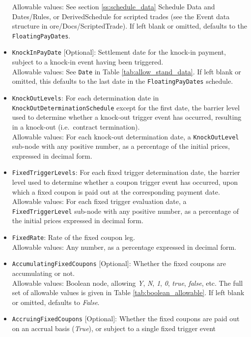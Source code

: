 \begin{itemize}
    Allowable values: See section \ref{ss:schedule_data} Schedule Data and Dates/Rules, or
    DerivedSchedule for scripted trades (see the Event data structure in ore/Docs/ScriptedTrade).
    If left blank or omitted, defaults to the \lstinline!FloatingPayDates!.
  \item \lstinline!KnockInPayDate! [Optional]: Settlement date for the knock-in
  payment, subject to a knock-in event having been triggered. \\
    Allowable values: See \lstinline!Date! in Table \ref{tab:allow_stand_data}. If left blank
    or omitted, this defaults to the last date in the \lstinline!FloatingPayDates! schedule.
  \item \lstinline!KnockOutLevels!: For each determination date in
  \lstinline!KnockOutDeterminationSchedule! except for the first date, the barrier level used
  to determine whether a knock-out trigger event has occurred, resulting in a knock-out (i.e.\
  contract termination). \\
    Allowable values: For each knock-out determination date, a \lstinline!KnockOutLevel!
    sub-node with any positive number, as a percentage of the initial prices, expressed in
    decimal form.
  \item \lstinline!FixedTriggerLevels!: For each fixed trigger determination date, the
  barrier level used to determine whether a coupon trigger event has occurred, upon which a
  fixed coupon is paid out at the corresponding payment date. \\
    Allowable values: For each fixed trigger evaluation date, a \lstinline!FixedTriggerLevel!
    sub-node with any positive number, as a percentage of the initial prices expressed in
    decimal form.
  \item \lstinline!FixedRate!: Rate of the fixed coupon leg. \\
    Allowable values: Any number, as a percentage expressed in decimal form.
  \item \lstinline!AccumulatingFixedCoupons! [Optional]: Whether the fixed coupons are accumulating or not. \\
    Allowable values: Boolean node, allowing \emph{Y}, \emph{N}, \emph{1}, \emph{0},
    \emph{true}, \emph{false}, etc. The full set of allowable values is given in Table
    \ref{tab:boolean_allowable}. If left blank or omitted, defaults to \emph{False}.
  \item \lstinline!AccruingFixedCoupons! [Optional]: Whether the fixed coupons are paid
  out on an accrual basis (\emph{True}), or subject to a single fixed trigger event

\end{itemize}
